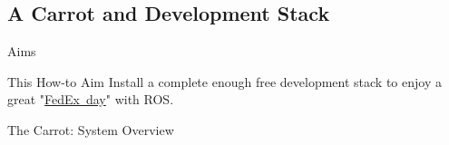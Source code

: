   \begin{frame}
    \tableofcontents[currentsection]
  \end{frame}

%
\subsection{A Carrot and Development Stack}

  \begin{frame}{Aims}
    \begin{alertblock}{This How-to Aim}
      Install a complete enough free development stack to enjoy a great "\href{http://www.atlassian.com/fedex-day}{FedEx~day}" with ROS.
    \end{alertblock}
    \begin{block}{The Carrot: System Overview}
      \begin{center}
      \end{center}
    \end{block}
  \end{frame}

